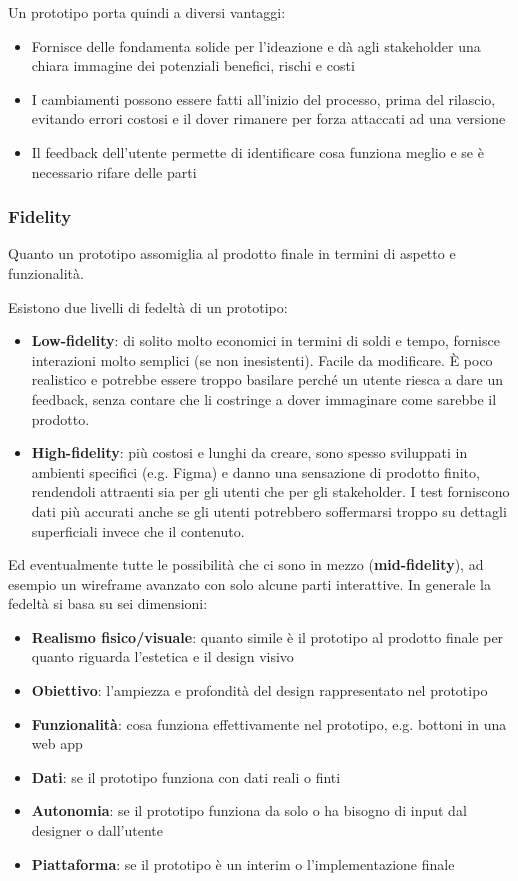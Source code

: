 Un prototipo porta quindi a diversi vantaggi:
\begin{itemize}
	\item Fornisce delle fondamenta solide per l'ideazione e dà agli stakeholder una chiara immagine dei potenziali benefici, rischi e costi
	\item I cambiamenti possono essere fatti all'inizio del processo, prima del rilascio, evitando errori costosi e il dover rimanere per forza attaccati ad una versione
	\item Il feedback dell'utente permette di identificare cosa funziona meglio e se è necessario rifare delle parti
\end{itemize}

\subsubsection{Fidelity}
\begin{definition}[Fidelity]
	Quanto un prototipo assomiglia al prodotto finale in termini di aspetto e funzionalità.
\end{definition}
Esistono due livelli di fedeltà di un prototipo:
\begin{itemize}
	\item \textbf{Low-fidelity}: di solito molto economici in termini di soldi e tempo, fornisce interazioni molto semplici (se non inesistenti). Facile da modificare. È poco realistico e potrebbe essere troppo basilare perché un utente riesca a dare un feedback, senza contare che li costringe a dover immaginare come sarebbe il prodotto.
	\item \textbf{High-fidelity}: più costosi e lunghi da creare, sono spesso sviluppati in ambienti specifici (e.g. Figma) e danno una sensazione di prodotto finito, rendendoli attraenti sia per gli utenti che per gli stakeholder. I test forniscono dati più accurati anche se gli utenti potrebbero soffermarsi troppo su dettagli superficiali invece che il contenuto.
\end{itemize}
Ed eventualmente tutte le possibilità che ci sono in mezzo (\textbf{mid-fidelity}), ad esempio un wireframe avanzato con solo alcune parti interattive. In generale la fedeltà si basa su sei dimensioni:
\begin{itemize}
	\item \textbf{Realismo fisico/visuale}: quanto simile è il prototipo al prodotto finale per quanto riguarda l'estetica e il design visivo
	\item \textbf{Obiettivo}: l'ampiezza e profondità del design rappresentato nel prototipo
	\item \textbf{Funzionalità}: cosa funziona effettivamente nel prototipo, e.g. bottoni in una web app
	\item \textbf{Dati}: se il prototipo funziona con dati reali o finti
	\item \textbf{Autonomia}: se il prototipo funziona da solo o ha bisogno di input dal designer o dall'utente
	\item \textbf{Piattaforma}: se il prototipo è un interim o l'implementazione finale
\end{itemize}


